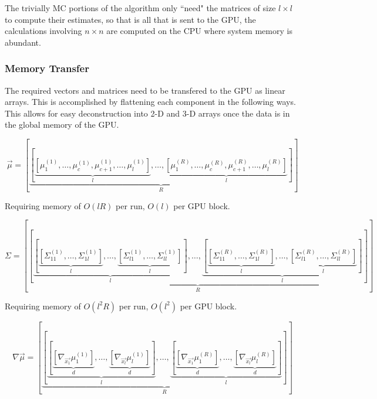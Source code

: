\documentclass[phd,tocprelim]{cornell}
\begin{document}
The trivially MC portions of the algorithm only ``need" the matrices of size $l \times l$ to compute their estimates, so that is all that is sent to the GPU, the calculations involving $n \times n$ are computed on the CPU where system memory is abundant.

\subsubsection{Memory Transfer} %
\label{ssub:Memory Transfer}

The required vectors and matrices need to be transfered to the GPU as linear arrays. This is accomplished by flattening each component in the following ways. This allows for easy deconstruction into 2-D and 3-D arrays once the data is in the global memory of the GPU.

\begin{equation}
    \vec{\mu} = \left[ \underbrace{\left[ \underbrace{\left[\mu_{1}^{(1)}, \ldots, \mu_{c}^{(1)}, \mu_{c+1}^{(1)}, \ldots, \mu_{l}^{(1)} \right]}_{l}, \ldots, \underbrace{\left[\mu_{1}^{(R)}, \ldots, \mu_{c}^{(R)}, \mu_{c+1}^{(R)}, \ldots, \mu_{l}^{(R)} \right]}_{l} \right]}_{R} \right]
\end{equation}

Requiring memory of $O(lR)$ per run, $O(l)$ per GPU block.

\begin{equation}
    \Sigma = \left[ \underbrace{ \left[ \underbrace{ \left[ \underbrace{ \left[ \Sigma_{11}^{(1)}, \ldots, \Sigma_{1l}^{(1)} \right]}_{l}, \ldots, \underbrace{ \left[ \Sigma_{l1}^{(1)}, \ldots, \Sigma_{ll}^{(1)} \right]}_{l} \right] }_{l}, \ldots, \underbrace{ \left[ \underbrace{ \left[ \Sigma_{11}^{(R)}, \ldots, \Sigma_{1l}^{(R)} \right]}_{l}, \ldots, \underbrace{ \left[ \Sigma_{l1}^{(R)}, \ldots, \Sigma_{ll}^{(R)} \right]}_{l} \right] }_{l}  \right]}_{R}\right]
\end{equation}

Requiring memory of $O(l^{2}R)$ per run, $O(l^{2})$ per GPU block.

\begin{equation}
    \nabla \vec{\mu} = \left[ \underbrace{ \left[ \underbrace{ \left[ \underbrace{ \left[ \nabla_{\vec{x_{1}}} \mu_{1}^{(1)} \right]}_{d} , \ldots, \underbrace{ \left[ \nabla_{\vec{x_{l}}} \mu_{l}^{(1)} \right]}_{d}\right]}_{l}, \ldots, \underbrace{ \left[ \underbrace{ \left[ \nabla_{\vec{x_{1}}} \mu_{1}^{(R)} \right]}_{d} , \ldots, \underbrace{ \left[ \nabla_{\vec{x_{l}}} \mu_{l}^{(R)} \right]}_{d}\right]}_{l} \right]}_{R} \right]
\end{equation}
\end{document}
